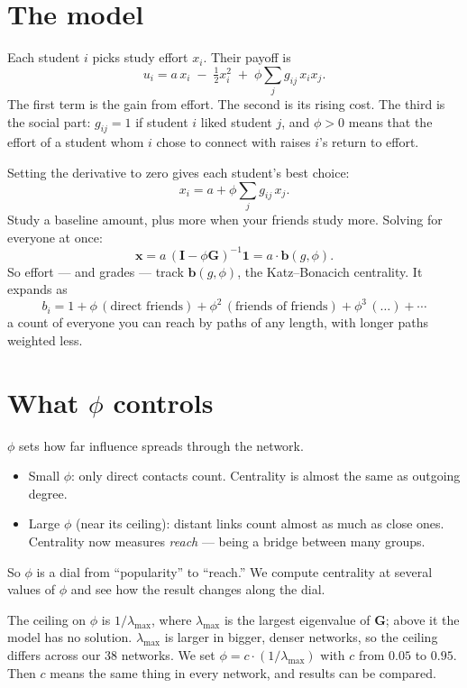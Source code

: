 \documentclass[11pt]{article}
\begin{document}
\section*{The model}

Each student $i$ picks study effort $x_i$. Their payoff is
\[
u_i = a\,x_i \;-\; \tfrac{1}{2}x_i^{2} \;+\; \phi \sum_{j} g_{ij}\,x_i x_j .
\]
The first term is the gain from effort. The second is its rising cost. The third is the
social part: $g_{ij}=1$ if student $i$ liked student $j$, and $\phi>0$ means that
the effort of a student whom $i$ chose to connect with raises $i$'s return to effort.

Setting the derivative to zero gives each student's best choice:
\[
x_i = a + \phi \sum_{j} g_{ij}\,x_j .
\]
Study a baseline amount, plus more when your friends study more. Solving for everyone at
once:
\[
\mathbf{x} = a\,(\mathbf{I} - \phi \mathbf{G})^{-1}\mathbf{1} = a\cdot \mathbf{b}(g,\phi).
\]
So effort --- and grades --- track $\mathbf{b}(g,\phi)$, the Katz--Bonacich centrality.
It expands as
\[
b_i = 1 + \phi\,(\text{direct friends}) + \phi^{2}\,(\text{friends of friends})
+ \phi^{3}\,(\dots) + \cdots
\]
a count of everyone you can reach by paths of any length, with longer paths weighted
less.

\section*{What \texorpdfstring{$\phi$}{phi} controls}

$\phi$ sets how far influence spreads through the network.
\begin{itemize}
  \item Small $\phi$: only direct contacts count. Centrality is almost the same as
        outgoing degree.
  \item Large $\phi$ (near its ceiling): distant links count almost as much as close
        ones. Centrality now measures \emph{reach} --- being a bridge between many
        groups.
\end{itemize}
So $\phi$ is a dial from ``popularity'' to ``reach.'' We compute centrality at several
values of $\phi$ and see how the result changes along the dial.

The ceiling on $\phi$ is $1/\lambda_{\max}$, where $\lambda_{\max}$ is the largest
eigenvalue of $\mathbf{G}$; above it the model has no solution. $\lambda_{\max}$ is
larger in bigger, denser networks, so the ceiling differs across our 38 networks. We
set $\phi = c \cdot (1/\lambda_{\max})$ with $c$ from $0.05$ to $0.95$. Then $c$ means
the same thing in every network, and results can be compared.
\end{document}
